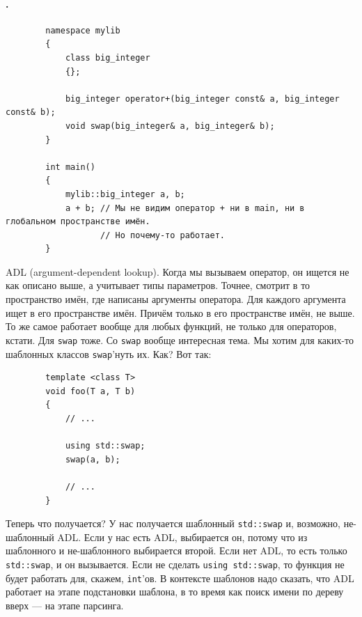 \documentclass{article}
\begin{document}
    \paragraph{.}
    \begin{verbatim}
        namespace mylib
        {
            class big_integer
            {};

            big_integer operator+(big_integer const& a, big_integer const& b);
            void swap(big_integer& a, big_integer& b);
        }

        int main()
        {
            mylib::big_integer a, b;
            a + b; // Мы не видим оператор + ни в main, ни в глобальном пространстве имён.
                   // Но почему-то работает.
        }
    \end{verbatim}
    ADL (argument-dependent lookup). Когда мы вызываем оператор, он ищется не как описано выше, а учитывает типы параметров. Точнее, смотрит в то пространство имён, где написаны аргументы оператора. Для каждого аргумента ищет в его пространстве имён. Причём только в его пространстве имён, не выше.\\
    То же самое работает вообще для любых функций, не только для операторов, кстати. Для \texttt{swap} тоже. Со \texttt{swap} вообще интересная тема. Мы хотим для каких-то шаблонных классов \texttt{swap}'нуть их. Как? Вот так:
    \begin{verbatim}
        template <class T>
        void foo(T a, T b)
        {
            // ...

            using std::swap;
            swap(a, b);

            // ...
        }
    \end{verbatim}
    Теперь что получается? У нас получается шаблонный \texttt{std::swap} и, возможно, не-шаблонный ADL. Если у нас есть ADL, выбирается он, потому что из шаблонного и не-шаблонного выбирается второй. Если нет ADL, то есть только \texttt{std::swap}, и он вызывается. Если не сделать \texttt{using std::swap}, то функция не будет работать для, скажем, \texttt{int}'ов.
    В контексте шаблонов надо сказать, что ADL работает на этапе подстановки шаблона, в то время как поиск имени по дереву вверх --- на этапе парсинга.
\end{document}
